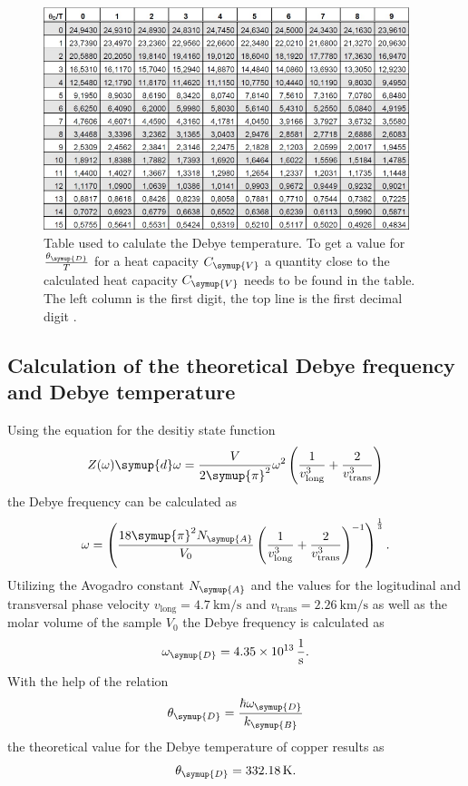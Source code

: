 \begin{figure}
  \centering
  \includegraphics[width = 0.95\textwidth]{content/pics/debyetemp.png}
  \caption{Table used to calulate the Debye temperature. To get a value for $\frac{\theta_{\symup{D}}}{T}$ for a heat capacity $C_{\symup{V}}$ a quantity close %
  to the calculated heat capacity $C_{\symup{V}}$ needs to be found in the table. The left column is the first digit, the top line is the first decimal digit \cite{V47}.} 
  \label{fig:debyetemp}
\end{figure}

\subsection{Calculation of the theoretical Debye frequency and Debye temperature}
\label{subsec:Calculation of the theoretical Debye frequency and Debye temperature}
Using the equation for the desitiy state function
\begin{equation*}
  Z(\omega)\symup{d}\omega = \frac{V}{2\symup{\pi}^2}\omega^2\left(\frac{1}{v^3_{\text{long}}}+\frac{2}{v^3_{\text{trans}}}\right)
\end{equation*}
the Debye frequency can be calculated as
\begin{equation*}
  \omega = \left(\frac{18\symup{\pi}^2N_{\symup{A}}}{V_0}\left(\frac{1}{v^3_{\text{long}}}+\frac{2}{v^3_{\text{trans}}}\right)^{-1}\right)^{\frac{1}{3}}.
\end{equation*}
Utilizing the Avogadro constant $N_{\symup{A}}$ and the values for the logitudinal and transversal phase velocity 
$v_{\text{long}} = \qty{4.7}{\kilo\metre\per\second}$ and $v_{\text{trans}}=\qty{2.26}{\kilo\metre\per\second}$ as well as the molar volume of the sample $V_0$ the Debye frequency is calculated as
\begin{equation*}
  \omega_{\symup{D}} = \qty{4.35e13}{\per\second}.
\end{equation*}
With the help of the relation
\begin{equation*}
  \theta_{\symup{D}} = \frac{\hbar\omega_{\symup{D}}}{k_{\symup{B}}}
\end{equation*}
the theoretical value for the Debye temperature of copper results as
\begin{equation*}
  \theta_{\symup{D}} = \qty{332.18}{\kelvin}.
\end{equation*}